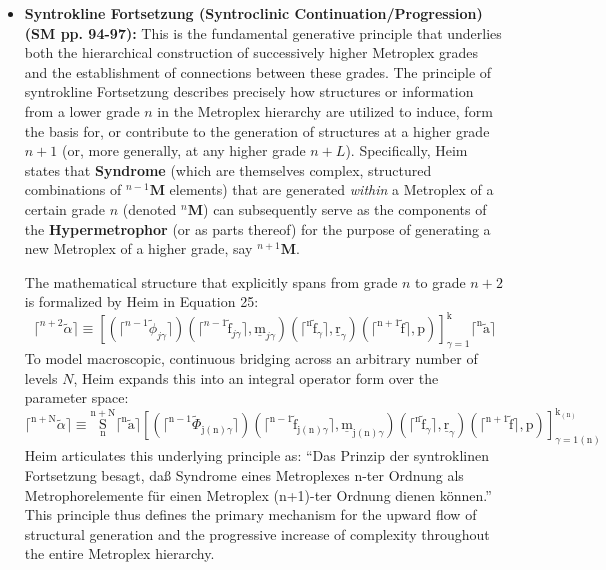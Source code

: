 \documentclass[12pt]{article}
\newcommand{\q}[1]{\enquote{#1}}
\newcommand{\metroplex}[1]{{}^{#1}\mathbf{M}}
\begin{document}
\begin{itemize}
    \item \textbf{Syntrokline Fortsetzung (Syntroclinic Continuation/Progression) (SM pp. 94-97):}
    This is the fundamental generative principle that underlies both the hierarchical construction of successively higher Metroplex grades and the establishment of connections between these grades. The principle of syntrokline Fortsetzung describes precisely how structures or information from a lower grade \( n \) in the Metroplex hierarchy are utilized to induce, form the basis for, or contribute to the generation of structures at a higher grade \( n+1 \) (or, more generally, at any higher grade \( n+L \)). Specifically, Heim states that \textbf{Syndrome} (which are themselves complex, structured combinations of \( \metroplex{n-1} \) elements) that are generated \textit{within} a Metroplex of a certain grade \( n \) (denoted \( \metroplex{n} \)) can subsequently serve as the components of the \textbf{Hypermetrophor} (or as parts thereof) for the purpose of generating a new Metroplex of a higher grade, say \( \metroplex{n+1} \). 
    
    The mathematical structure that explicitly spans from grade \( n \) to grade \( n+2 \) is formalized by Heim in Equation 25:
    \begin{equation}
\lceil^{n+2} \tilde{\alpha} \rceil \equiv \left[ \left( \lceil^{n-1} \tilde{\phi}_{j\gamma} \rceil \right) \left( \lceil^{n-1} \tilde{\mathrm{f}}_{j\gamma} \rceil, \underline{\mathrm{m}}_{j\gamma} \right) \left( \lceil^\mathrm{n} \tilde{\mathrm{f}}_\gamma \rceil, \underline{\mathrm{r}}_\gamma \right) \left( \lceil^{\mathrm{n}+1} \tilde{\mathrm{f}} \rceil, \mathrm{p} \right) \right]_{\gamma=1}^\mathrm{k} \lceil^\mathrm{n} \tilde{\mathrm{a}} \rceil
\label{eq:original_syntroclinic_bridge_25}
\tag{25}
\end{equation}
    To model macroscopic, continuous bridging across an arbitrary number of levels \( N \), Heim expands this into an integral operator form over the parameter space:
    \begin{equation}
\lceil^{\mathrm{n}+\mathrm{N}} \tilde{\alpha} \rceil \equiv \underset{\mathrm{n}}{\overset{\mathrm{n}+\mathrm{N}}{\mathrm{S}}} \lceil^\mathrm{n} \tilde{\mathrm{a}} \rceil \left[ \left( \lceil^{\mathrm{n}-1} \tilde{\Phi}_{\mathrm{j(n)}\gamma} \rceil \right) \left( \lceil^{\mathrm{n}-1} \tilde{\mathrm{f}}_{\mathrm{j(n)}\gamma} \rceil, \underline{\mathrm{m}}_{\mathrm{j(n)}\gamma} \right) \left( \lceil^\mathrm{n} \tilde{\mathrm{f}}_\gamma \rceil, \underline{\mathrm{r}}_\gamma \right) \left( \lceil^{\mathrm{n}+1} \tilde{\mathrm{f}} \rceil, \mathrm{p} \right) \right]_{\gamma=1\mathrm{(n)}}^{\mathrm{k}_{\mathrm{(n)}}}
\tag{25a}
\end{equation}
    Heim articulates this underlying principle as: \q{Das Prinzip der syntroklinen Fortsetzung besagt, daß Syndrome eines Metroplexes n-ter Ordnung als Metrophorelemente für einen Metroplex (n+1)-ter Ordnung dienen können.} This principle thus defines the primary mechanism for the upward flow of structural generation and the progressive increase of complexity throughout the entire Metroplex hierarchy.


\end{itemize}
\end{document}
